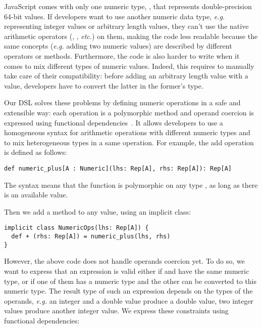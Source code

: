 \documentclass[american,english,runningheads]{llncs}
\newcommand{\eg}{\emph{e.g.}}
\newcommand{\etc}{\emph{etc.}}
\begin{document}
JavaScript comes with only one numeric type, , that represents double-precision 64-bit values. If developers want to use another numeric data type, \eg{} representing integer values or arbitrary length values, they can’t use the native arithmetic operators (\code{+}, \code{-}, \etc) on them, making the code less readable because the same concepts (\eg{} adding two numeric values) are described by different operators or methods. Furthermore, the code is also harder to write when it comes to mix different types of numeric values. Indeed, this requires to manually take care of their compatibility: before adding an arbitrary length value with a  value, developers have to convert the latter in the former’s type.

Our DSL solves these problems by defining numeric operations in a safe and extensible way: each operation is a polymorphic method and operand coercion is expressed using functional dependencies~\cite{Jones00_FunDeps}. It allows developers to use a homogeneous syntax for arithmetic operations with different numeric types and to mix heterogeneous types in a same operation. For example, the add operation is defined as follows:

\begin{lstlisting}
def numeric_plus[A : Numeric](lhs: Rep[A], rhs: Rep[A]): Rep[A]
\end{lstlisting}

The  syntax means that the function is polymorphic on any type , as long as there is an available  value.

Then we add a \code{+} method to any  value, using an implicit class:

\begin{lstlisting}
implicit class NumericOps(lhs: Rep[A]) {
  def + (rhs: Rep[A]) = numeric_plus(lhs, rhs)
}
\end{lstlisting}

However, the above code does not handle operands coercion yet. To do so, we want to express that an expression  is valid either if  and  have the same numeric type, or if one of them has a numeric type and the other can be converted to this numeric type. The result type of such an expression depends on the types of the operands, \eg{} an integer and a double value produce a double value, two integer values produce another integer value. We express these constraints using functional dependencies:
\end{document}
